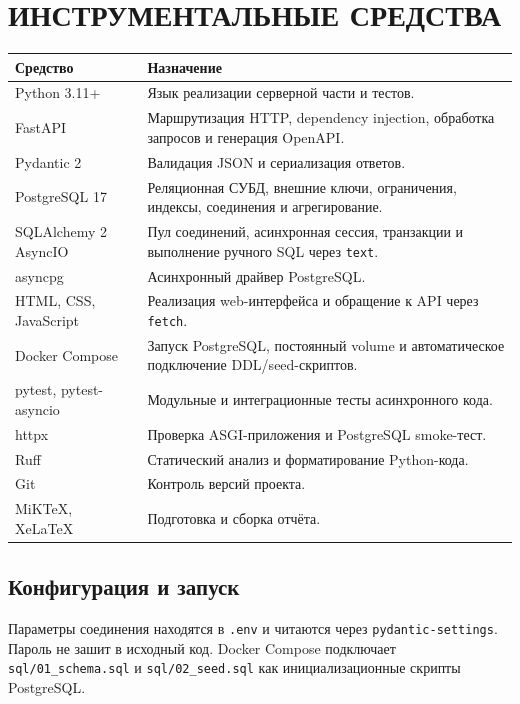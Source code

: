 \documentclass[14pt,a4paper]{extarticle}
\begin{document}
\clearpage
\section{ИНСТРУМЕНТАЛЬНЫЕ СРЕДСТВА}

\begin{longtable}{L{0.28\textwidth} L{0.62\textwidth}}
\toprule
\textbf{Средство} & \textbf{Назначение} \\
\midrule
\endhead
Python 3.11+ & Язык реализации серверной части и тестов. \\
FastAPI & Маршрутизация HTTP, dependency injection, обработка запросов и генерация OpenAPI. \\
Pydantic 2 & Валидация JSON и сериализация ответов. \\
PostgreSQL 17 & Реляционная СУБД, внешние ключи, ограничения, индексы, соединения и агрегирование. \\
SQLAlchemy 2 AsyncIO & Пул соединений, асинхронная сессия, транзакции и выполнение ручного SQL через \texttt{text}. \\
asyncpg & Асинхронный драйвер PostgreSQL. \\
HTML, CSS, JavaScript & Реализация web-интерфейса и обращение к API через \texttt{fetch}. \\
Docker Compose & Запуск PostgreSQL, постоянный volume и автоматическое подключение DDL/seed-скриптов. \\
pytest, pytest-asyncio & Модульные и интеграционные тесты асинхронного кода. \\
httpx & Проверка ASGI-приложения и PostgreSQL smoke-тест. \\
Ruff & Статический анализ и форматирование Python-кода. \\
Git & Контроль версий проекта. \\
MiKTeX, XeLaTeX & Подготовка и сборка отчёта. \\
\bottomrule
\end{longtable}

\subsection{Конфигурация и запуск}

Параметры соединения находятся в \texttt{.env} и читаются через
\texttt{pydantic-settings}. Пароль не зашит в исходный код. Docker Compose
подключает \texttt{sql/01\_schema.sql} и \texttt{sql/02\_seed.sql} как
инициализационные скрипты PostgreSQL.
\end{document}
